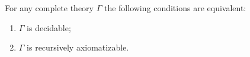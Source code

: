 For any complete theory $\Gamma$ the following conditions are equivalent:

\begin{enumerate}
\item[(i)] $\Gamma$ is decidable;
\item[(ii)] $\Gamma$ is recursively axiomatizable.
\end{enumerate}
